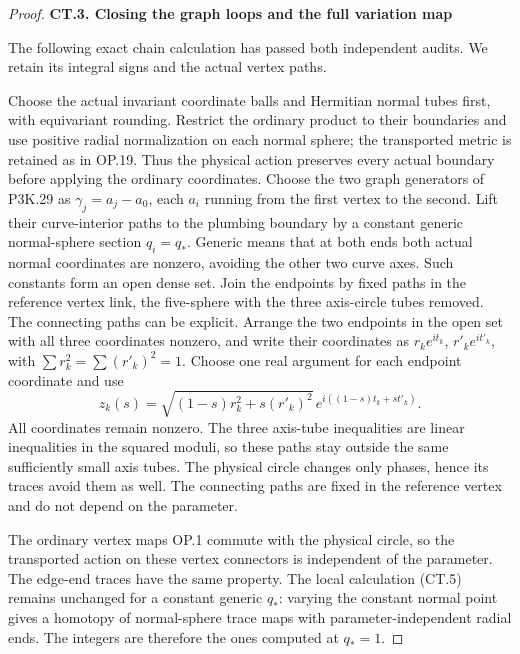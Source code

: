 \begin{proof}
\par

\medskip\noindent\textbf{CT.3. Closing the graph loops and the full variation map}

\par\nobreak

The following exact chain calculation has passed both independent
audits. We retain its integral signs and the actual vertex paths.

Choose the actual invariant coordinate balls and Hermitian normal
tubes first, with equivariant rounding. Restrict the ordinary product
to their boundaries and use positive radial normalization on each
normal sphere; the transported metric is retained as in OP.19. Thus
the physical action preserves every actual boundary before applying
the ordinary coordinates. Choose the two graph generators of P3K.29 as
\(\gamma_j=a_j-a_0\), each \(a_i\) running from the first vertex
to the second. Lift their curve-interior paths to the plumbing
boundary by a constant generic normal-sphere section \(q_i=q_*\).
Generic means that at both ends both actual normal coordinates are
nonzero, avoiding the other two curve axes. Such constants form an
open dense set. Join the endpoints by fixed paths in the reference
vertex link, the five-sphere with the three axis-circle tubes
removed. The connecting paths can be explicit. Arrange the two
endpoints in the open set with all three coordinates nonzero, and
write their coordinates as \(r_ke^{it_k}\), \(r'_ke^{it'_k}\), with
\(\sum r_k^2=\sum(r'_k)^2=1\). Choose one real argument for each
endpoint coordinate and use
\[
 z_k(s)=\sqrt{(1-s)r_k^2+s(r'_k)^2}\,
                 e^{i((1-s)t_k+st'_k)}.
\]
All coordinates remain nonzero. The three axis-tube inequalities
are linear inequalities in the squared moduli, so these paths stay
outside the same sufficiently small axis tubes. The physical
circle changes only phases, hence its traces avoid them as well.
The connecting paths are fixed in the reference vertex and do not
depend on the parameter.

The ordinary vertex maps OP.1 commute with the physical circle, so
the transported action on these vertex connectors is independent
of the parameter. The edge-end traces have the same property. The
local calculation (CT.5) remains unchanged for a constant generic
\(q_*\): varying the constant normal point gives a homotopy of
normal-sphere trace maps with parameter-independent radial ends.
The integers are therefore the ones computed at \(q_*=1\).


\end{proof}

